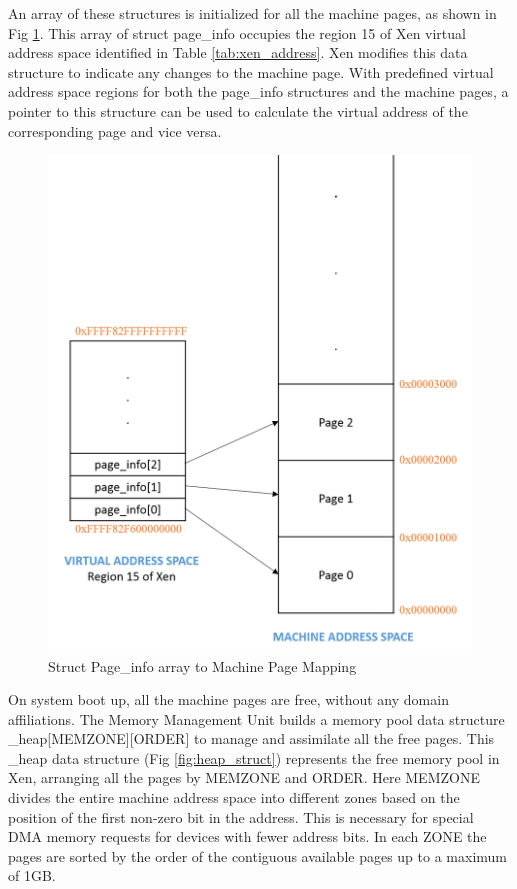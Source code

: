 An array of these structures is initialized for all the machine pages, as shown in Fig \ref{fig:page_info_mapping}. This array of struct page\_info occupies the region 15 of Xen virtual address space identified in Table \ref{tab:xen_address}. Xen modifies this data structure to indicate any changes to the machine page. With predefined virtual address space regions for both the page\_info structures and the machine pages, a pointer to this structure can be used to calculate the virtual address of the corresponding page and vice versa. 

\begin{figure}[H]
\centering
\includegraphics[scale=0.8]{figures/page_info.png}
\caption[Struct page\_info Array to Machine Page Mapping]{Struct Page\_info array to Machine Page Mapping \cite{xen_code}}
\label{fig:page_info_mapping}
\end{figure}

On system boot up, all the machine pages are free, without any domain affiliations. The Memory Management Unit builds a memory pool data structure \_heap[MEMZONE][ORDER] to manage and assimilate all the free pages. This \_heap data structure (Fig \ref{fig:heap_struct}) represents the free memory pool in Xen, arranging all the pages by MEMZONE and ORDER. Here MEMZONE divides the entire machine address space into different zones based on the position of the first non-zero bit in the address. This is necessary for special DMA memory requests for devices with fewer address bits. In each ZONE the pages are sorted by the order of the contiguous available pages up to a maximum of 1GB. 


